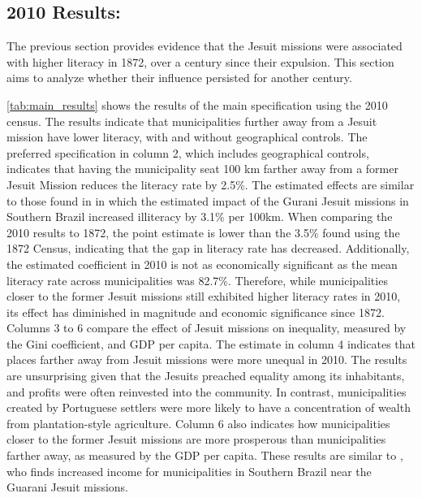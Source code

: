 \documentclass{article}
\begin{document}

\subsection{2010 Results:}

The previous section provides evidence that the Jesuit missions were associated with higher literacy in 1872, over a century since their expulsion. 
This section aims to analyze whether their influence persisted for another century.

\autoref{tab:main_results} shows the results of the main specification using the 2010 census. 
The results indicate that municipalities further away from a Jesuit mission have lower literacy, with and without geographical controls.
The preferred specification in column 2, which includes geographical controls, indicates that having the municipality seat 100 km farther away from a former Jesuit Mission reduces the literacy rate by 2.5\%.
The estimated effects are similar to those found in \textcite{Valencia_Caicedo2018-gp} in which the estimated impact of the Gurani Jesuit missions in Southern Brazil increased illiteracy by 3.1\% per 100km. 
When comparing the 2010 results to 1872, the point estimate is lower than the 3.5\% found using the 1872 Census, indicating that the gap in literacy rate has decreased. 
Additionally, the estimated coefficient in 2010 is not as economically significant as the mean literacy rate across municipalities was 82.7\%. 
Therefore, while municipalities closer to the former Jesuit missions still exhibited higher literacy rates in 2010, its effect has diminished in magnitude and economic significance since 1872. 
Columns 3 to 6 compare the effect of Jesuit missions on inequality, measured by the Gini coefficient, and GDP per capita. 
The estimate in column 4 indicates that places farther away from Jesuit missions were more unequal in 2010. 
The results are unsurprising given that the Jesuits preached equality among its inhabitants, and profits were often reinvested into the community. 
In contrast, municipalities created by Portuguese settlers were more likely to have a concentration of wealth from plantation-style agriculture. Column 6 also indicates how municipalities closer to the former Jesuit missions are more prosperous than municipalities farther away, as measured by the GDP per capita. 
These results are similar to \textcite{Valencia_Caicedo2018-gp}, who finds increased income for municipalities in Southern Brazil near the Guarani Jesuit missions. 
\end{document}
